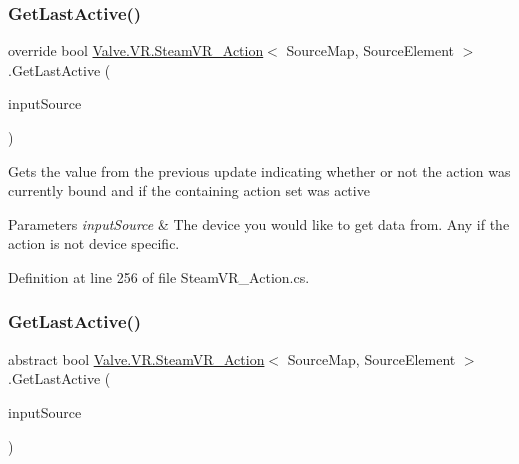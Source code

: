 \subsubsection{\texorpdfstring{GetLastActive()}{GetLastActive()}\hspace{0.1cm}{\footnotesize\ttfamily [1/2]}}
{\footnotesize\ttfamily override bool \mbox{\hyperlink{class_valve_1_1_v_r_1_1_steam_v_r___action}{Valve.\+V\+R.\+Steam\+V\+R\+\_\+\+Action}}$<$ Source\+Map, Source\+Element $>$.Get\+Last\+Active (\begin{DoxyParamCaption}\item[{\mbox{\hyperlink{namespace_valve_1_1_v_r_a82e5bf501cc3aa155444ee3f0662853f}{Steam\+V\+R\+\_\+\+Input\+\_\+\+Sources}}}]{input\+Source }\end{DoxyParamCaption})}



Gets the value from the previous update indicating whether or not the action was currently bound and if the containing action set was active 


\begin{DoxyParams}{Parameters}
{\em input\+Source} & The device you would like to get data from. Any if the action is not device specific.\\
\hline
\end{DoxyParams}


Definition at line 256 of file Steam\+V\+R\+\_\+\+Action.\+cs.

\mbox{\label{class_valve_1_1_v_r_1_1_steam_v_r___action_a33092fe773f3dd669be8cb019a1dffa4}} 
\subsubsection{\texorpdfstring{GetLastActive()}{GetLastActive()}\hspace{0.1cm}{\footnotesize\ttfamily [2/2]}}
{\footnotesize\ttfamily abstract bool \mbox{\hyperlink{class_valve_1_1_v_r_1_1_steam_v_r___action}{Valve.\+V\+R.\+Steam\+V\+R\+\_\+\+Action}}$<$ Source\+Map, Source\+Element $>$.Get\+Last\+Active (\begin{DoxyParamCaption}\item[{\mbox{\hyperlink{namespace_valve_1_1_v_r_a82e5bf501cc3aa155444ee3f0662853f}{Steam\+V\+R\+\_\+\+Input\+\_\+\+Sources}}}]{input\+Source }\end{DoxyParamCaption})\hspace{0.3cm}{\ttfamily [pure virtual]}}



